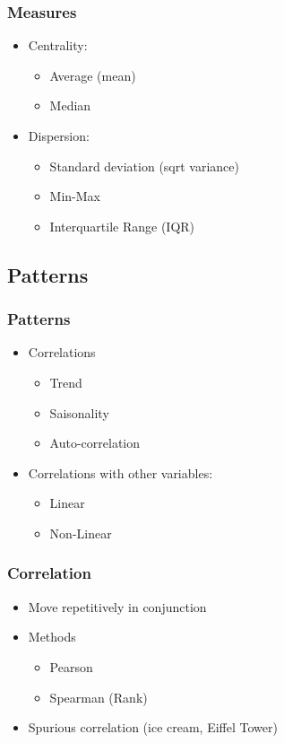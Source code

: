 \begin{frame}\frametitle{Measures}
   \begin{itemize}
      \item Centrality:
      \begin{itemize}
         \item Average (mean)
         \item Median
      \end{itemize}
      \item Dispersion:
      \begin{itemize}
         \item Standard deviation (sqrt variance)
         \item Min-Max
         \item Interquartile Range (IQR)
      \end{itemize}

   \end{itemize}
\end{frame}

\subsection{Patterns}

\begin{frame}\frametitle{Patterns}
   \begin{itemize}
      \item Correlations
      \begin{itemize}
         \item Trend
         \item Saisonality
         \item Auto-correlation
      \end{itemize}
      \item Correlations with other variables:
      \begin{itemize}
         \item Linear
         \item Non-Linear
      \end{itemize}
   \end{itemize}
\end{frame}

\begin{frame}\frametitle{Correlation}
   \begin{itemize}
      \item Move repetitively in conjunction
      \item Methods
      \begin{itemize}
         \item Pearson
         \item Spearman (Rank)
      \end{itemize}
      \item Spurious correlation (ice cream, Eiffel Tower)
   \end{itemize}
\end{frame}


